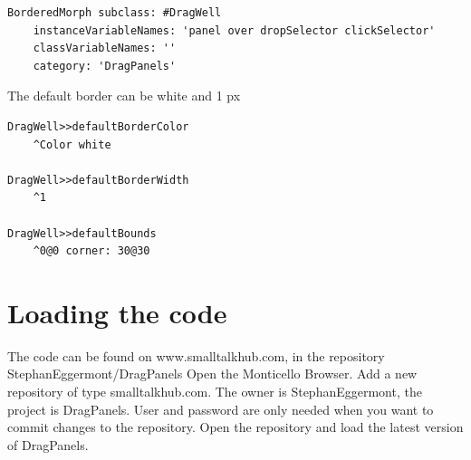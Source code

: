 \documentclass[10pt, twoside]{article}   	%
\begin{document}
\begin{verbatim}
BorderedMorph subclass: #DragWell
    instanceVariableNames: 'panel over dropSelector clickSelector'
    classVariableNames: ''
    category: 'DragPanels'
\end{verbatim} 
The default border can be white and 1 px
\begin{verbatim}
DragWell>>defaultBorderColor
    ^Color white

DragWell>>defaultBorderWidth
    ^1

DragWell>>defaultBounds
    ^0@0 corner: 30@30
\end{verbatim}


\section{Loading the code}
The code can be found on www.smalltalkhub.com, in the repository StephanEggermont/DragPanels
Open the Monticello Browser. Add a new repository of type smalltalkhub.com. 
The owner is StephanEggermont, the project is DragPanels. User and password are only needed
when you want to commit changes to the repository. Open the repository and load the latest version of
DragPanels.
\end{document}
